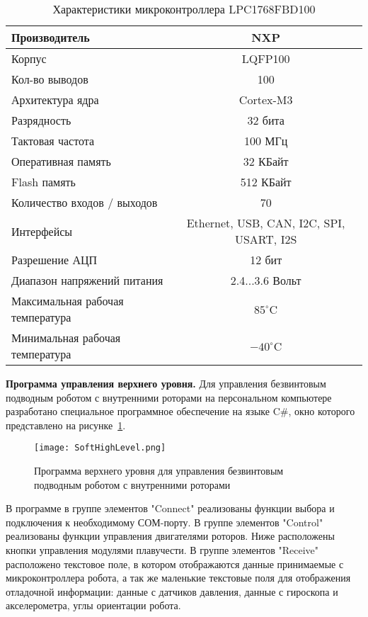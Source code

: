 \begin{table}[h]
	\centering
	\caption{Характеристики микроконтроллера LPC1768FBD100}\label{tabLpc}
	\begin{tabular}{|l|c|}
		\hline
		Производитель &	NXP \\ \hline
		Корпус 	& LQFP100 \\ \hline
		Кол-во выводов 	& 100\\ \hline
		Архитектура ядра & Cortex-M3	\\ \hline
		Разрядность	& 32 бита\\ \hline
		Тактовая частота	& 100 МГц 	\\ \hline
		Оперативная память 	& 32 КБайт\\ \hline		
		Flash память & 512 КБайт\\ \hline		
		Количество входов / выходов & 70	\\ \hline
		Интерфейсы 	& Ethernet, USB, CAN, I2C, SPI, USART, I2S\\ \hline
		Разрешение АЦП & 12 бит\\ \hline
		Диапазон напряжений питания 	& 2.4...3.6 Вольт\\ \hline	
		Максимальная рабочая температура	&	$85^\circ$C 	\\ \hline
		Минимальная рабочая температура 	&	$-40^\circ$C \\ \hline	
	\end{tabular}
\end{table}

\textbf{Программа управления верхнего уровня.} Для управления безвинтовым подводным роботом с внутренними роторами на персональном компьютере разработано специальное программное обеспечение на языке C\#, окно которого представлено на рисунке~\ref{SoftHighLevel}. 

\begin{figure}[h]
	\centering
	\texttt{[image: SoftHighLevel.png]}%
	\caption{Программа верхнего уровня для управления безвинтовым подводным роботом с внутренними роторами}
	\label{SoftHighLevel}
\end{figure}

В программе в группе элементов "Connect" реализованы функции выбора и подключения к необходимому СОМ-порту. В группе элементов "Control" реализованы функции управления двигателями роторов. Ниже расположены кнопки управления модулями плавучести. В группе элементов "Receive" расположено текстовое поле, в котором отображаются данные принимаемые с микроконтроллера робота, а так же маленькие текстовые поля для отображения отладочной информации: данные с датчиков давления, данные с гироскопа и акселерометра, углы ориентации робота.



